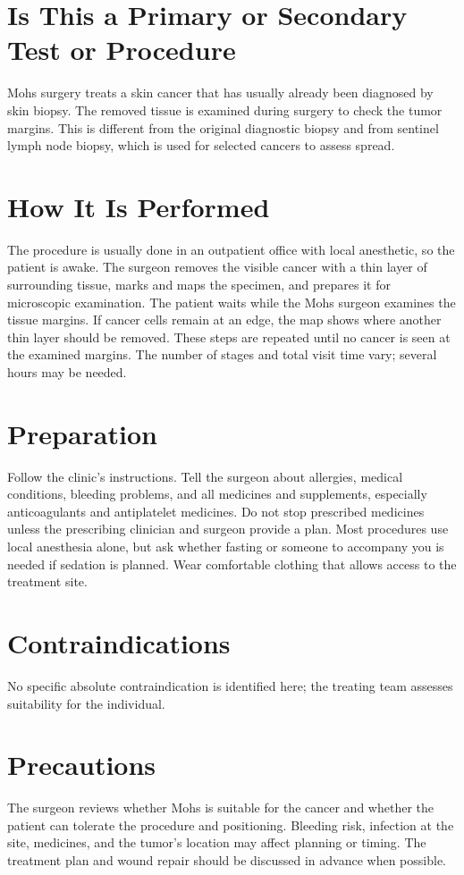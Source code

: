\section*{Is This a Primary or Secondary Test or Procedure}
Mohs surgery treats a skin cancer that has usually already been diagnosed by skin biopsy. The removed tissue is examined during surgery to check the tumor margins. This is different from the original diagnostic biopsy and from sentinel lymph node biopsy, which is used for selected cancers to assess spread.

\section*{How It Is Performed}
The procedure is usually done in an outpatient office with local anesthetic, so the patient is awake. The surgeon removes the visible cancer with a thin layer of surrounding tissue, marks and maps the specimen, and prepares it for microscopic examination. The patient waits while the Mohs surgeon examines the tissue margins. If cancer cells remain at an edge, the map shows where another thin layer should be removed. These steps are repeated until no cancer is seen at the examined margins. The number of stages and total visit time vary; several hours may be needed.

\section*{Preparation}
Follow the clinic's instructions. Tell the surgeon about allergies, medical conditions, bleeding problems, and all medicines and supplements, especially anticoagulants and antiplatelet medicines. Do not stop prescribed medicines unless the prescribing clinician and surgeon provide a plan. Most procedures use local anesthesia alone, but ask whether fasting or someone to accompany you is needed if sedation is planned. Wear comfortable clothing that allows access to the treatment site.

\section*{Contraindications}
No specific absolute contraindication is identified here; the treating team assesses suitability for the individual.

\section*{Precautions}
The surgeon reviews whether Mohs is suitable for the cancer and whether the patient can tolerate the procedure and positioning. Bleeding risk, infection at the site, medicines, and the tumor's location may affect planning or timing. The treatment plan and wound repair should be discussed in advance when possible.

